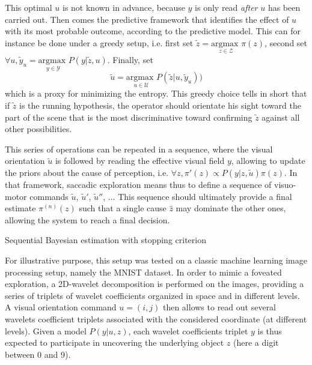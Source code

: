 \documentclass[12pt,twoside,openright]{article}
\begin{document}
	This optimal $u$ is not known in advance, because $y$ is only read \emph{after} $u$ has been carried out. Then comes the predictive framework that identifies the effect of $u$ with its most probable outcome, according to the predictive model. This can for instance be done under a greedy setup, i.e. first set $\tilde{z} = \underset{z \in \mathcal{Z}}{\text{argmax }} \pi(z)$, second set $\forall u, \tilde{y}_u = \underset{y \in \mathcal{Y}}{\text{argmax }} P(y|\tilde{z},u)$.
	Finally, set 
	\begin{equation}
	\tilde{u} = \underset{u \in \mathcal{U}}{\text{argmax }}  P(\tilde{z}|u,\tilde{y}_u))
	\end{equation} which is a proxy for minimizing the entropy. This greedy choice tells in short that if $\tilde{z}$ is the running hypothesis, the operator should orientate his sight toward 
	the part of the scene that is the most discriminative toward confirming $\tilde{z}$ against all other possibilities. 
	
	This series of operations can be repeated in a sequence, where the visual orientation $\tilde{u}$ is followed by reading the effective visual field $y$, allowing to update the priors about the cause of perception, i.e. $\forall z, \pi'(z) \propto  P(y|z,\tilde{u}) \pi(z)$. In that framework, saccadic exploration means thus to define a sequence of visuo-motor commands $\tilde{u}$, $\tilde{u}'$, $\tilde{u}''$, ... This sequence should ultimately provide a final estimate $\pi^{(n)}(z)$ such that a single cause $\hat{z}$ may dominate the other ones, allowing the system to reach a final decision.  
	
	{\color{magenta} Sequential Bayesian estimation with stopping criterion} 
	
	For illustrative purpose, this setup was tested on a classic machine learning image processing setup, namely the MNIST dataset. In order to mimic a foveated exploration, a 2D-wavelet decomposition is performed on the images, providing a series of triplets of wavelet coefficients organized in space and in different levels. A visual orientation command $u = (i,j)$ then allows to read out several wavelets coefficient triplets associated with the considered coordinate (at different levels). Given a model $P(y|u,z)$, each  wavelet coefficients triplet $y$ is thus expected to participate in uncovering the underlying object $z$ (here a digit between 0 and 9).
\end{document}
